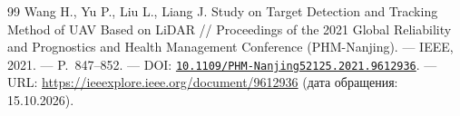 \documentclass{misisarticle}
\begin{document}
\begin{thebibliography}{99}
 Wang H., Yu P., Liu L., Liang J. Study on Target Detection and Tracking Method of UAV Based on LiDAR // Proceedings of the 2021 Global Reliability and Prognostics and Health Management Conference (PHM-Nanjing). --- IEEE, 2021. --- P.~847--852. --- DOI: \href{https://doi.org/10.1109/PHM-Nanjing52125.2021.9612936}{\nolinkurl{10.1109/PHM-Nanjing52125.2021.9612936}}. --- URL: \url{https://ieeexplore.ieee.org/document/9612936} (дата обращения: 15.10.2026).

\end{thebibliography}
\end{document}
